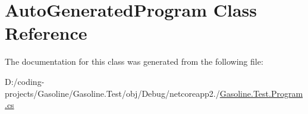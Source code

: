 \hypertarget{class_auto_generated_program}{}\section{Auto\+Generated\+Program Class Reference}
\label{class_auto_generated_program}


The documentation for this class was generated from the following file\+:\begin{DoxyCompactItemize}
\item 
D\+:/coding-\/projects/\+Gasoline/\+Gasoline.\+Test/obj/\+Debug/netcoreapp2./\mbox{\hyperlink{_gasoline_8_test_8_program_8cs}{Gasoline.\+Test.\+Program.\+cs}}\end{DoxyCompactItemize}
